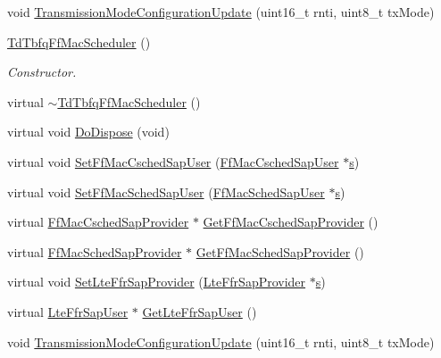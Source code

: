\begin{DoxyCompactItemize}
\item 
void \hyperlink{classns3_1_1TdTbfqFfMacScheduler_a891b790a6d5b1c87184caa73b5060c9e}{Transmission\+Mode\+Configuration\+Update} (uint16\+\_\+t rnti, uint8\+\_\+t tx\+Mode)
\item 
\hyperlink{classns3_1_1TdTbfqFfMacScheduler_ae3122288024d362f6257689e8f1cb55f}{Td\+Tbfq\+Ff\+Mac\+Scheduler} ()
\begin{DoxyCompactList}\small\item\em Constructor. \end{DoxyCompactList}\item 
virtual \hyperlink{classns3_1_1TdTbfqFfMacScheduler_a05b0b0369cc7f7d552b0313b36560654}{$\sim$\+Td\+Tbfq\+Ff\+Mac\+Scheduler} ()
\item 
virtual void \hyperlink{classns3_1_1TdTbfqFfMacScheduler_a8a6414c59327b7aa567db9e74b6afda1}{Do\+Dispose} (void)
\item 
virtual void \hyperlink{classns3_1_1TdTbfqFfMacScheduler_ad8f44a9b2ac001c855d82e3b9ded502f}{Set\+Ff\+Mac\+Csched\+Sap\+User} (\hyperlink{classns3_1_1FfMacCschedSapUser}{Ff\+Mac\+Csched\+Sap\+User} $\ast$\hyperlink{generate__test__data__lte__sinr_8m_ad83eeb3a142285d1243a08c6b7026df8}{s})
\item 
virtual void \hyperlink{classns3_1_1TdTbfqFfMacScheduler_a6a8a5bb008c669fa4cdae8799344de4a}{Set\+Ff\+Mac\+Sched\+Sap\+User} (\hyperlink{classns3_1_1FfMacSchedSapUser}{Ff\+Mac\+Sched\+Sap\+User} $\ast$\hyperlink{generate__test__data__lte__sinr_8m_ad83eeb3a142285d1243a08c6b7026df8}{s})
\item 
virtual \hyperlink{classns3_1_1FfMacCschedSapProvider}{Ff\+Mac\+Csched\+Sap\+Provider} $\ast$ \hyperlink{classns3_1_1TdTbfqFfMacScheduler_a26040de50aa8ef1d30fba59c17eab29f}{Get\+Ff\+Mac\+Csched\+Sap\+Provider} ()
\item 
virtual \hyperlink{classns3_1_1FfMacSchedSapProvider}{Ff\+Mac\+Sched\+Sap\+Provider} $\ast$ \hyperlink{classns3_1_1TdTbfqFfMacScheduler_a6be16307a7f3a930a4fd92c968b6025a}{Get\+Ff\+Mac\+Sched\+Sap\+Provider} ()
\item 
virtual void \hyperlink{classns3_1_1TdTbfqFfMacScheduler_aa04823cd675b273ac38dcc1863dd3659}{Set\+Lte\+Ffr\+Sap\+Provider} (\hyperlink{classns3_1_1LteFfrSapProvider}{Lte\+Ffr\+Sap\+Provider} $\ast$\hyperlink{generate__test__data__lte__sinr_8m_ad83eeb3a142285d1243a08c6b7026df8}{s})
\item 
virtual \hyperlink{classns3_1_1LteFfrSapUser}{Lte\+Ffr\+Sap\+User} $\ast$ \hyperlink{classns3_1_1TdTbfqFfMacScheduler_a5797de400f1de13da0156a378099bd13}{Get\+Lte\+Ffr\+Sap\+User} ()
\item 
void \hyperlink{classns3_1_1TdTbfqFfMacScheduler_a891b790a6d5b1c87184caa73b5060c9e}{Transmission\+Mode\+Configuration\+Update} (uint16\+\_\+t rnti, uint8\+\_\+t tx\+Mode)
\end{DoxyCompactItemize}
